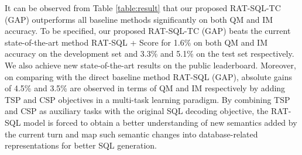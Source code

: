 \documentclass[a4paper]{article}
\begin{document}
\begin{table}[htbp]
\centering
{}
\caption{QM and IM accuracy of our proposed RAT-SQL-TC (GAP) and several baselines. RAT-SQL-TC (GAP) outperforms all baseline methods and achieves new state-of-the-art results.}
\label{table:result}\vspace{-3mm}
\end{table}

It can be observed from Table \ref{table:result} that our proposed RAT-SQL-TC (GAP) outperforms all baseline methods significantly on both QM and IM accuracy. To be specified, our proposed RAT-SQL-TC (GAP) beats the current state-of-the-art method RAT-SQL + Score for 1.6\% on both QM and IM accuracy on the development set and 3.3\% and 5.1\% on the test set respectively. We also achieve new state-of-the-art results on the public leaderboard. Moreover, on comparing with the direct baseline method RAT-SQL (GAP), absolute gains of 4.5\% and 3.5\% are observed in terms of QM and IM respectively by adding TSP and CSP objectives in a multi-task learning paradigm. By combining TSP and CSP as auxiliary tasks with the original SQL decoding objective, the RAT-SQL model is forced to obtain a better understanding of new semantics added by the current turn and map such semantic changes into database-related representations for better SQL generation.
\end{document}
